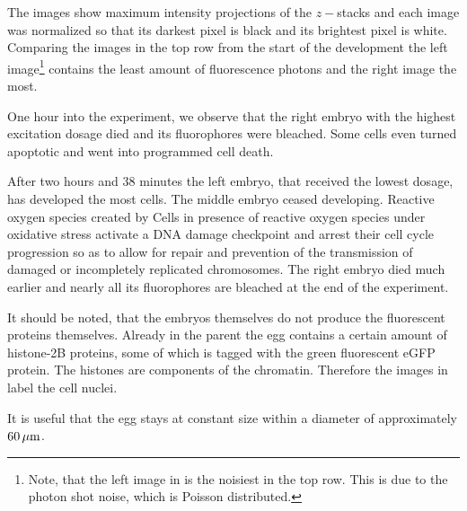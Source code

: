 The images show maximum intensity projections of the $z-$stacks and     
each image was normalized so that its darkest pixel is black and its
brightest pixel is white. Comparing the images in the top row from the
start of the development the left image\footnote{Note, that the left
  image in  is the noisiest in the top
  row. This is due to the photon shot noise, which is Poisson
  distributed.} contains the least amount of fluorescence photons and
the right image the most.

One hour into the experiment, we observe that the right embryo with
the highest excitation dosage died and its fluorophores were bleached.
Some cells even turned apoptotic and went into programmed cell death.

After two hours and 38 minutes the left embryo, that received the
lowest dosage, has developed the most cells. The middle embryo ceased
developing. Reactive oxygen species created by Cells in presence of
reactive oxygen species under oxidative stress activate a DNA damage
checkpoint and arrest their cell cycle progression so as to allow for
repair and prevention of the transmission of damaged or incompletely
replicated chromosomes. The right embryo died much earlier and nearly
all its fluorophores are bleached at the end of the experiment.



It should be noted, that the embryos themselves do not produce the    
fluorescent proteins themselves. Already in the parent the egg
contains a certain amount of histone-2B proteins, some of which is
tagged with the green fluorescent eGFP protein. The histones are
components of the chromatin. Therefore the images in
 label the cell nuclei.

It is useful that the egg stays at constant size within a diameter   
of approximately $\unit[60]{\mu m}$.

  


